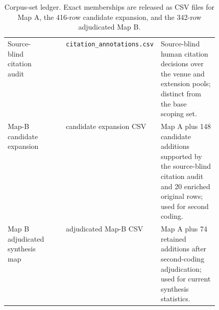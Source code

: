 \begin{table}[t]
\begin{tabularx}{\linewidth}{>{\raggedright\arraybackslash}p{0.17\linewidth}>{\raggedleft\arraybackslash}p{0.07\linewidth}>{\raggedright\arraybackslash}p{0.24\linewidth}X}
Source-blind citation audit & 300 & \texttt{citation\_annotations.csv} & Source-blind human citation decisions over the venue and extension pools; distinct from the base scoping set. \\
Map-B candidate expansion & 416 & candidate expansion CSV & Map A plus 148 candidate additions supported by the source-blind citation audit and 20 enriched original rows; used for second coding. \\
Map B adjudicated synthesis map & 342 & adjudicated Map-B CSV & Map A plus 74 retained additions after second-coding adjudication; used for current synthesis statistics. \\
\bottomrule
\end{tabularx}
\caption{Corpus-set ledger. Exact memberships are released as CSV files for Map A, the 416-row candidate expansion, and the 342-row adjudicated Map B.}
\label{tab:set-selection-ledger}
\end{table}
